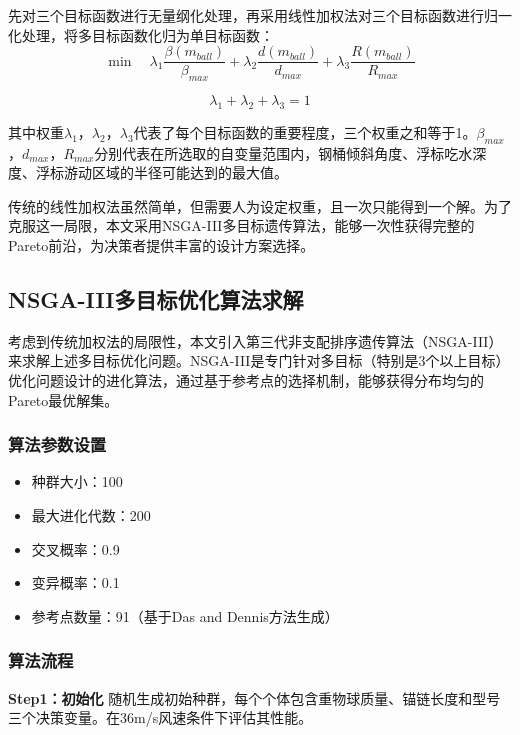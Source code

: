 \documentclass[withoutpreface,bwprint]{cumcmthesis}
\begin{document}
先对三个目标函数进行无量纲化处理，再采用线性加权法对三个目标函数进行归一化处理，将多目标函数化归为单目标函数：
\begin{equation}
\min \quad \lambda_1 \frac{\beta(m_{ball})}{\beta_{max}} + \lambda_2 \frac{d(m_{ball})}{d_{max}} + \lambda_3 \frac{R(m_{ball})}{R_{max}}
\end{equation}

\begin{equation}
\lambda_1 + \lambda_2 + \lambda_3 = 1
\end{equation}

其中权重$\lambda_1$，$\lambda_2$，$\lambda_3$代表了每个目标函数的重要程度，三个权重之和等于1。$\beta_{max}$，$d_{max}$，$R_{max}$分别代表在所选取的自变量范围内，钢桶倾斜角度、浮标吃水深度、浮标游动区域的半径可能达到的最大值。

传统的线性加权法虽然简单，但需要人为设定权重，且一次只能得到一个解。为了克服这一局限，本文采用NSGA-III多目标遗传算法，能够一次性获得完整的Pareto前沿，为决策者提供丰富的设计方案选择。

\subsection{NSGA-III多目标优化算法求解}

考虑到传统加权法的局限性，本文引入第三代非支配排序遗传算法（NSGA-III）来求解上述多目标优化问题。NSGA-III是专门针对多目标（特别是3个以上目标）优化问题设计的进化算法，通过基于参考点的选择机制，能够获得分布均匀的Pareto最优解集。

\subsubsection{算法参数设置}
\begin{itemize}[itemindent=2em]
\item 种群大小：100
\item 最大进化代数：200
\item 交叉概率：0.9
\item 变异概率：0.1
\item 参考点数量：91（基于Das and Dennis方法生成）
\end{itemize}

\subsubsection{算法流程}
\textbf{Step1：初始化}
随机生成初始种群，每个个体包含重物球质量、锚链长度和型号三个决策变量。在36m/s风速条件下评估其性能。
\end{document}
